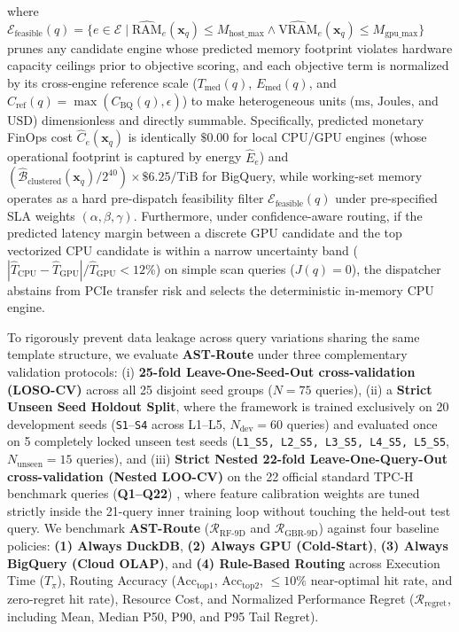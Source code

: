 \documentclass[10pt,a4paper]{article}
\begin{document}
where $\mathcal{E}_{\text{feasible}}(q) = \{e \in \mathcal{E} \mid \widehat{\text{RAM}}_e(\mathbf{x}_q) \le M_{\text{host\_max}} \land \widehat{\text{VRAM}}_e(\mathbf{x}_q) \le M_{\text{gpu\_max}}\}$ prunes any candidate engine whose predicted memory footprint violates hardware capacity ceilings prior to objective scoring, and each objective term is normalized by its cross-engine reference scale ($T_{\text{med}}(q)$, $E_{\text{med}}(q)$, and $C_{\text{ref}}(q) = \max(C_{\text{BQ}}(q), \epsilon)$) to make heterogeneous units ($\text{ms}$, $\text{Joules}$, and $\text{USD}$) dimensionless and directly summable. Specifically, predicted monetary FinOps cost $\hat{C}_e(\mathbf{x}_q)$ is identically $\$0.00$ for local CPU/GPU engines (whose operational footprint is captured by energy $\hat{E}_e$) and $(\hat{\mathcal{B}}_{\text{clustered}}(\mathbf{x}_q)/2^{40})\times \$6.25\text{/TiB}$ for BigQuery, while working-set memory operates as a hard pre-dispatch feasibility filter $\mathcal{E}_{\text{feasible}}(q)$ under pre-specified SLA weights $(\alpha,\beta,\gamma)$. Furthermore, under confidence-aware routing, if the predicted latency margin between a discrete GPU candidate and the top vectorized CPU candidate is within a narrow uncertainty band ($|\hat{T}_{\text{CPU}} - \hat{T}_{\text{GPU}}|/\hat{T}_{\text{GPU}} < 12\%$) on simple scan queries ($J(q)=0$), the dispatcher abstains from PCIe transfer risk and selects the deterministic in-memory CPU engine.

To rigorously prevent data leakage across query variations sharing the same template structure, we evaluate \textbf{AST-Route} under three complementary validation protocols: (i) \textbf{25-fold Leave-One-Seed-Out cross-validation (LOSO-CV)} across all 25 disjoint seed groups ($N=75$ queries), (ii) a \textbf{Strict Unseen Seed Holdout Split}, where the framework is trained exclusively on 20 development seeds (\texttt{S1}--\texttt{S4} across L1--L5, $N_{\text{dev}}=60$ queries) and evaluated once on 5 completely locked unseen test seeds (\texttt{L1\_S5, L2\_S5, L3\_S5, L4\_S5, L5\_S5}, $N_{\text{unseen}}=15$ queries), and (iii) \textbf{Strict Nested 22-fold Leave-One-Query-Out cross-validation (Nested LOO-CV)} on the 22 official standard TPC-H benchmark queries (\textbf{Q1--Q22}) \cite{tpc2022tpch}, where feature calibration weights are tuned strictly inside the 21-query inner training loop without touching the held-out test query. We benchmark \textbf{AST-Route} ($\mathcal{R}_{\text{RF-9D}}$ and $\mathcal{R}_{\text{GBR-9D}}$) against four baseline policies: \textbf{(1) Always DuckDB}, \textbf{(2) Always GPU (Cold-Start)}, \textbf{(3) Always BigQuery (Cloud OLAP)}, and \textbf{(4) Rule-Based Routing} across Execution Time ($T_{\pi}$), Routing Accuracy ($\text{Acc}_{\text{top1}}$, $\text{Acc}_{\text{top2}}$, $\le 10\%$ near-optimal hit rate, and zero-regret hit rate), Resource Cost, and Normalized Performance Regret ($\mathcal{R}_{\text{regret}}$, including Mean, Median P50, P90, and P95 Tail Regret).
\end{document}
